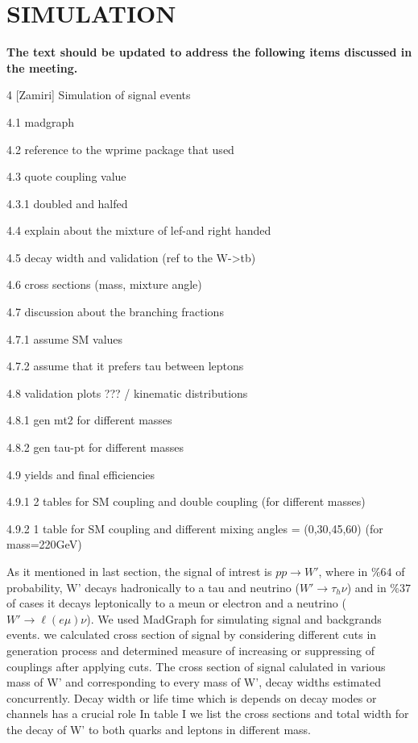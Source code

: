 \section{SIMULATION}\label{sec:evo}

{\bf The text should be updated to address the following items discussed in the meeting.}

4 [Zamiri] Simulation of signal events

4.1 madgraph

4.2 reference to the wprime package that used

4.3 quote coupling value

4.3.1 doubled and halfed

4.4 explain about the mixture of lef-and right handed

4.5 decay width and validation (ref to the W->tb)

4.6 cross sections (mass, mixture angle)

4.7 discussion about the branching fractions

4.7.1 assume SM values

4.7.2 assume that it prefers tau between leptons

4.8 validation plots ??? / kinematic distributions

4.8.1 gen mt2 for different masses

4.8.2 gen tau-pt for different masses

4.9 yields and final efficiencies

4.9.1 2 tables for SM coupling and double coupling (for different masses)

4.9.2 1 table for SM coupling and different mixing angles = (0,30,45,60) (for 
mass=220GeV)






As it mentioned in last section, the signal of intrest is $ pp\rightarrow W' $, where in $\%64$ of probability, W' decays hadronically to a tau and neutrino ($ W' \rightarrow \tau_{h} \nu $) and in $\%37$ of cases it decays leptonically to a meun or electron and a neutrino ($ W' \rightarrow \ell(e\mu) \nu  $). We used MadGraph \cite{Alwall:2011uj} for simulating signal and backgrands events. we calculated cross section of signal by considering different cuts in generation process and determined measure of increasing or suppressing of couplings after applying cuts. 
The cross section of signal calulated in various mass of W' and corresponding to every mass of W', decay widths estimated concurrently. Decay width or life time which is depends on decay modes or channels has a crucial role In table I we list the cross sections and total width for the decay of W' to both quarks and leptons in different mass.

